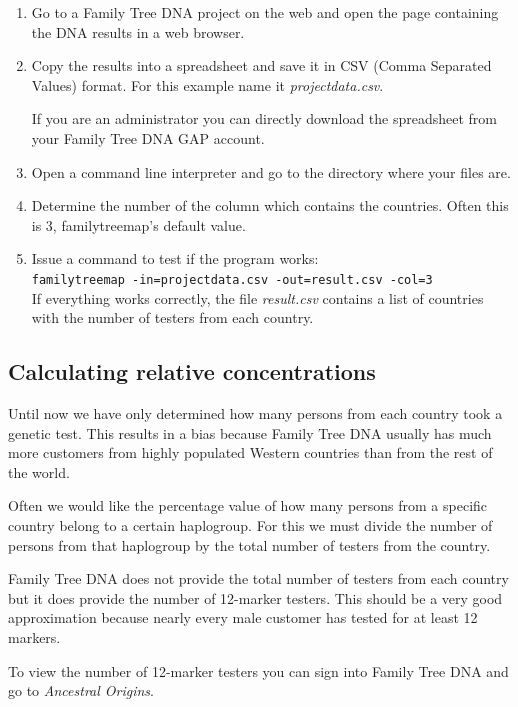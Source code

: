 \documentclass[12pt,a4paper]{article}
\begin{document}
\begin{enumerate}
\item Go to a Family Tree DNA project on the web and open the
  page containing the DNA results in a web browser.
\item Copy the results into a spreadsheet and save it in
  CSV (Comma Separated Values) format. For this example
  name it \emph{projectdata.csv}.

  If you are an administrator you can directly download the
  spreadsheet from your Family Tree DNA GAP account.

\item Open a command line interpreter and go to the
   directory where your files are.
\item Determine the number of the column which contains
  the countries. Often this is 3, familytreemap's default
  value.
\item Issue a command to test if the program works:\\
  \texttt{familytreemap -in=projectdata.csv -out=result.csv -col=3}\\
  If everything works correctly, the file \emph{result.csv}
  contains a list of countries with the number of testers
  from each country.
\end{enumerate}


\subsection{Calculating relative concentrations}

Until now we have only determined how many persons from each
country took a genetic test. This results in a bias because
Family Tree DNA usually has much more customers from highly
populated Western countries than from the rest of the world.

Often we would like the percentage value of how many persons
from a specific country belong to a certain haplogroup. For
this we must divide the number of persons from that haplogroup
by the total number of testers from the country.

Family Tree DNA does not provide the total number of testers
from each country but it does provide the number of 12-marker
testers. This should be a very good approximation because nearly
every male customer has tested for at least 12 markers.

To view the number of 12-marker testers you can sign into
Family Tree DNA and go to \emph{Ancestral Origins}.
\end{document}
